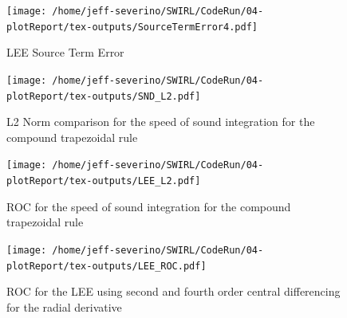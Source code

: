 \begin{figure}[!]
    \centering
    \texttt{[image: /home/jeff-severino/SWIRL/CodeRun/04-plotReport/tex-outputs/SourceTermError4.pdf]}
    \caption{LEE Source Term Error}
    \label{fig:7}
\end{figure}

\begin{figure}[!]
    \centering
    \texttt{[image: /home/jeff-severino/SWIRL/CodeRun/04-plotReport/tex-outputs/SND\_L2.pdf]}
    \caption{L2 Norm comparison for the speed of sound integration for the compound trapezoidal rule}
    \label{fig:8}
\end{figure}



\begin{figure}[!]
    \centering
    \texttt{[image: /home/jeff-severino/SWIRL/CodeRun/04-plotReport/tex-outputs/LEE\_L2.pdf]}
    \caption{ROC  for the speed of sound integration for the compound trapezoidal rule}
    \label{fig:9}
\end{figure}


\begin{figure}[!]
    \centering
        \texttt{[image: /home/jeff-severino/SWIRL/CodeRun/04-plotReport/tex-outputs/LEE\_ROC.pdf]}
       \caption{ROC for the LEE using second and fourth order central differencing
       for the radial derivative}
        \label{fig:10}
\end{figure}





